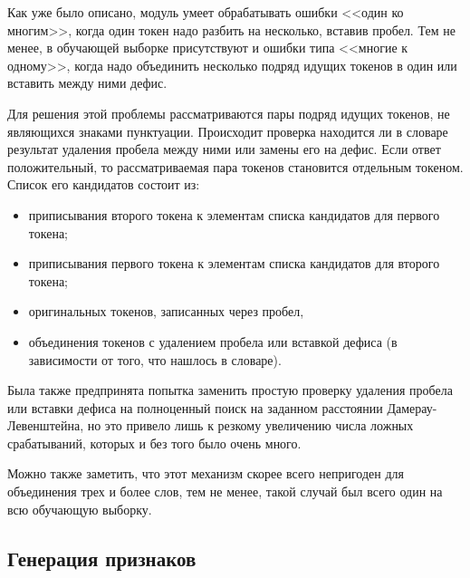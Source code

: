 Как уже было описано, модуль умеет обрабатывать ошибки <<один ко многим>>, когда один токен надо разбить на несколько, вставив пробел. Тем не менее, в обучающей выборке присутствуют и ошибки типа <<многие к одному>>, когда надо объединить несколько подряд идущих токенов в один или вставить между ними дефис.

Для решения этой проблемы рассматриваются пары подряд идущих токенов, не являющихся знаками пунктуации. Происходит проверка находится ли в словаре результат удаления пробела между ними или замены его на дефис. Если ответ положительный, то рассматриваемая пара токенов становится отдельным токеном. Список его кандидатов состоит из:
\begin{itemize}
	\item приписывания второго токена к элементам списка кандидатов для первого токена;
	\item приписывания первого токена к элементам списка кандидатов для второго токена;
	\item оригинальных токенов, записанных через пробел,
	\item объединения токенов с удалением пробела или вставкой дефиса (в зависимости от того, что нашлось в словаре).
\end{itemize}

Была также предпринята попытка заменить простую проверку удаления пробела или вставки дефиса на полноценный поиск на заданном расстоянии Дамерау-Левенштейна, но это привело лишь к резкому увеличению числа ложных срабатываний, которых и без того было очень много. 

Можно также заметить, что этот механизм скорее всего непригоден для объединения трех и более слов, тем не менее, такой случай был всего один на всю обучающую выборку.

\subsection{Генерация признаков}

